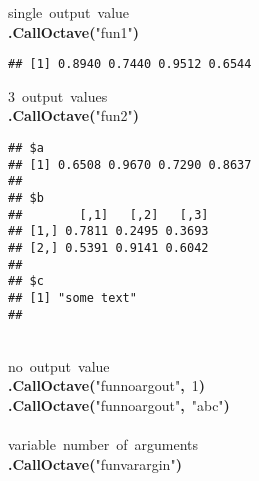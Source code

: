 \documentclass[english,10pt,a4paper]{article}\usepackage{graphicx, color}
\makeatletter
\newcommand{\hlnumber}[1]{\textcolor[rgb]{0,0,0}{#1}}%
\newcommand{\hlfunctioncall}[1]{\textcolor[rgb]{0.501960784313725,0,0.329411764705882}{\textbf{#1}}}%
\newcommand{\hlstring}[1]{\textcolor[rgb]{0.6,0.6,1}{#1}}%
\newcommand{\hlkeyword}[1]{\textcolor[rgb]{0,0,0}{\textbf{#1}}}%
\newcommand{\hlcomment}[1]{\textcolor[rgb]{0.180392156862745,0.6,0.341176470588235}{#1}}%
\newcommand{\hlstd}[1]{\textcolor[rgb]{0,0,0}{#1}}%
\newenvironment{kframe}{%
 \def\FrameCommand##1{\hskip\@totalleftmargin \hskip-\fboxsep
 \colorbox{shadecolor}{##1}\hskip-\fboxsep
     \hskip-\linewidth \hskip-\@totalleftmargin \hskip\columnwidth}%
 \MakeFramed {\advance\hsize-\width
   \@totalleftmargin\z@ \linewidth\hsize
   \@setminipage}}%
 {\par\unskip\endMakeFramed}
\newenvironment{knitrout}{}{} %
\makeatother
\begin{document}
\begin{knitrout}
\color{fgcolor}\begin{kframe}
\begin{flushleft}
\ttfamily\noindent
\hlcomment{\usebox{\hlnormalsizeboxhash}{\ }single{\ }output{\ }value}\hspace*{\fill}\\
\hlstd{}\hlfunctioncall{.CallOctave}\hlkeyword{(}\hlstring{"{}fun1"{}}\hlkeyword{)}\mbox{}
\normalfont
\end{flushleft}
\begin{verbatim}
## [1] 0.8940 0.7440 0.9512 0.6544
\end{verbatim}
\begin{flushleft}
\ttfamily\noindent
\hlcomment{\usebox{\hlnormalsizeboxhash}{\ }3{\ }output{\ }values}\hspace*{\fill}\\
\hlstd{}\hlfunctioncall{.CallOctave}\hlkeyword{(}\hlstring{"{}fun2"{}}\hlkeyword{)}\mbox{}
\normalfont
\end{flushleft}
\begin{verbatim}
## $a
## [1] 0.6508 0.9670 0.7290 0.8637
## 
## $b
##        [,1]   [,2]   [,3]
## [1,] 0.7811 0.2495 0.3693
## [2,] 0.5391 0.9141 0.6042
## 
## $c
## [1] "some text"
## 
\end{verbatim}
\begin{flushleft}
\ttfamily\noindent
\hspace*{\fill}\\
\hlstd{}\hlcomment{\usebox{\hlnormalsizeboxhash}{\ }no{\ }output{\ }value}\hspace*{\fill}\\
\hlstd{}\hlfunctioncall{.CallOctave}\hlkeyword{(}\hlstring{"{}fun\usebox{\hlnormalsizeboxunderscore}noargout"{}}\hlkeyword{,}{\ }\hlnumber{1}\hlkeyword{)}\hspace*{\fill}\\
\hlstd{}\hlfunctioncall{.CallOctave}\hlkeyword{(}\hlstring{"{}fun\usebox{\hlnormalsizeboxunderscore}noargout"{}}\hlkeyword{,}{\ }\hlstring{"{}abc"{}}\hlkeyword{)}\hspace*{\fill}\\
\hlstd{}\hspace*{\fill}\\
\hlstd{}\hlcomment{\usebox{\hlnormalsizeboxhash}{\ }variable{\ }number{\ }of{\ }arguments}\hspace*{\fill}\\
\hlstd{}\hlfunctioncall{.CallOctave}\hlkeyword{(}\hlstring{"{}fun\usebox{\hlnormalsizeboxunderscore}varargin"{}}\hlkeyword{)}\mbox{}

\end{flushleft}
\end{kframe}
\end{knitrout}
\end{document}
